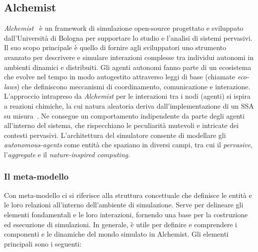 \subsection{Alchemist}
\textit{Alchemist}~\cite{Pianini_2013} è un framework di simulazione open-source progettato e sviluppato dall'Università di Bologna per supportare lo studio e l'analisi di sistemi pervasivi.  Il suo scopo principale è quello di fornire agli sviluppatori uno strumento avanzato per descrivere e simulare interazioni complesse tra individui autonomi in ambienti dinamici e distribuiti. Gli agenti autonomi fanno parte di un ecosistema che evolve nel tempo in modo autogestito attraverso leggi di base (chiamate \textit{eco-laws}) che definiscono meccanismi di coordinamento, comunicazione e interazione. 
L'approccio intrapreso da \textit{Alchemist} per le interazioni tra i nodi (agenti) si ispira a reazioni chimiche, la cui natura aleatoria deriva dall'implementazione di un \ac{SSA} su misura~\cite{PMV2011}. Ne consegue  un comportamento indipendente da parte degli agenti all'interno del sistema, che rispecchiano le peculiarità mutevoli e intricate dei contesti pervasivi.
L'architettura del simulatore consente di modellare gli \textit{autonomous-agents} come entità che spaziano in diversi campi, tra cui il \textit{pervasive}, l'\textit{aggregate} e il \textit{nature-inspired computing}.

\subsubsection{Il meta-modello}
Con meta-modello ci si riferisce alla struttura concettuale che definisce le entità e le loro relazioni all'interno dell'ambiente di simulazione. Serve per delineare gli elementi fondamentali e le loro interazioni, fornendo una base per la costruzione ed esecuzione di simulazioni. In generale, è utile per definire e comprendere i componenti e le dinamiche del mondo simulato in Alchemist. Gli elementi principali sono i seguenti:

